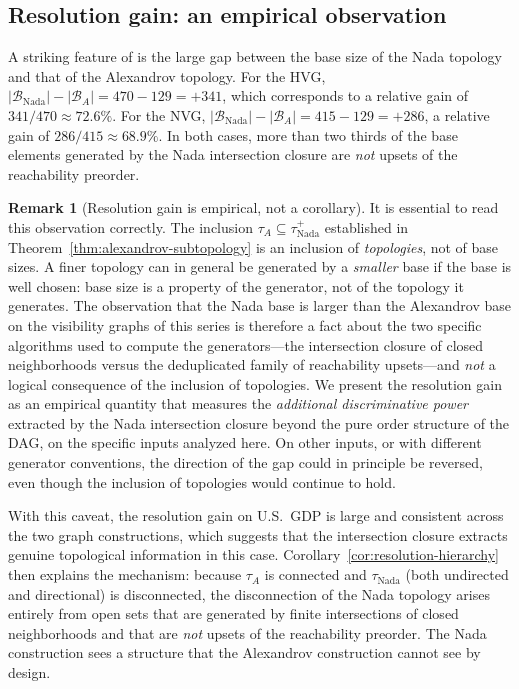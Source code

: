 \documentclass[11pt,a4paper]{article}
\theoremstyle{plain}
\theoremstyle{definition}
\newtheorem{remark}[theorem]{Remark}
\newcommand{\taufwd}{\tau^{+}}
\newcommand{\base}{\mathcal{B}}
\begin{document}
\subsection{Resolution gain: an empirical observation}%
\label{subsec:resolution-gain}

A striking feature of  is the large gap between
the base size of the Nada topology and that of the Alexandrov topology.
For the HVG, $|\base_{\text{Nada}}| - |\base_A| = 470 - 129 = +341$,
which corresponds to a relative gain of
$341 / 470 \approx 72.6\%$. For the NVG, $|\base_{\text{Nada}}| -
|\base_A| = 415 - 129 = +286$, a relative gain of
$286 / 415 \approx 68.9\%$. In both cases, more than two thirds of the
base elements generated by the Nada intersection closure are \emph{not}
upsets of the reachability preorder.

\begin{remark}[Resolution gain is empirical, not a corollary]%
\label{rem:resolution-gain-empirical}
It is essential to read this observation correctly. The inclusion
$\tau_A \subseteq \taufwd_{\text{Nada}}$ established in
Theorem~\ref{thm:alexandrov-subtopology} is an inclusion of
\emph{topologies}, not of base sizes. A finer topology can in general be
generated by a \emph{smaller} base if the base is well chosen: base size
is a property of the generator, not of the topology it generates. The
observation that the Nada base is larger than the Alexandrov base on
the visibility graphs of this series is therefore a fact about the two
specific algorithms used to compute the generators---the intersection
closure of closed neighborhoods versus the deduplicated family of
reachability upsets---and \emph{not} a logical consequence of the
inclusion of topologies. We present the resolution gain as an empirical
quantity that measures the \emph{additional discriminative power}
extracted by the Nada intersection closure beyond the pure order
structure of the DAG, on the specific inputs analyzed here. On other
inputs, or with different generator conventions, the direction of the
gap could in principle be reversed, even though the inclusion of
topologies would continue to hold.
\end{remark}

With this caveat, the resolution gain on U.S.\ GDP is large and
consistent across the two graph constructions, which suggests that the
intersection closure extracts genuine topological information in this
case. Corollary~\ref{cor:resolution-hierarchy} then explains the
mechanism: because $\tau_A$ is connected and $\tau_{\text{Nada}}$ (both
undirected and directional) is disconnected, the disconnection of the
Nada topology arises entirely from open sets that are generated by
finite intersections of closed neighborhoods and that are \emph{not}
upsets of the reachability preorder. The Nada construction sees a
structure that the Alexandrov construction cannot see by design.
\end{document}
